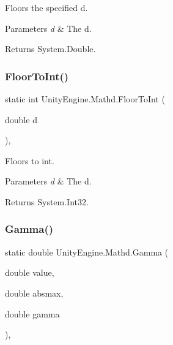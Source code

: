Floors the specified d. 


\begin{DoxyParams}{Parameters}
{\em d} & The d.\\
\hline
\end{DoxyParams}
\begin{DoxyReturn}{Returns}
System.\+Double.
\end{DoxyReturn}
\mbox{\label{struct_unity_engine_1_1_mathd_a18ac2d0ed9be3f37f0f047903435a7de}} 
\subsubsection{\texorpdfstring{Floor\+To\+Int()}{FloorToInt()}}
{\footnotesize\ttfamily static int Unity\+Engine.\+Mathd.\+Floor\+To\+Int (\begin{DoxyParamCaption}\item[{double}]{d }\end{DoxyParamCaption})\hspace{0.3cm}{\ttfamily [inline]}, {\ttfamily [static]}}



Floors to int. 


\begin{DoxyParams}{Parameters}
{\em d} & The d.\\
\hline
\end{DoxyParams}
\begin{DoxyReturn}{Returns}
System.\+Int32.
\end{DoxyReturn}
\mbox{\label{struct_unity_engine_1_1_mathd_af85b55be5457184d92d707f274ff93c2}} 
\subsubsection{\texorpdfstring{Gamma()}{Gamma()}}
{\footnotesize\ttfamily static double Unity\+Engine.\+Mathd.\+Gamma (\begin{DoxyParamCaption}\item[{double}]{value,  }\item[{double}]{absmax,  }\item[{double}]{gamma }\end{DoxyParamCaption})\hspace{0.3cm}{\ttfamily [inline]}, {\ttfamily [static]}}



